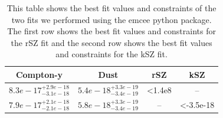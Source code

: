 \documentclass{princeton_astro_thesis}
\begin{document}
\begin{table}[h!]
\centering
\begin{tabular}{||c c c c||} 
 \hline
Compton-y & Dust & rSZ & kSZ \\ [0.5ex] 
 \hline\hline %
 $8.3e-17^{+2.9e-18}_{-3.1e-18}$ & $5.4e-18^{+3.3e-19}_{-3.4e-19}$ & <1.4e8 & -- \\[0.25 cm] 
 $7.9e-17^{+2.1e-18}_{-2.1e-18}$ & $5.8e-18^{+3.3e-19}_{-3.4e-19}$ & -- & <-3.5e-18 \\ [1ex] 
 \hline
\end{tabular}
\caption{This table shows the best fit values and constraints of the two fits we performed using the emcee python package. The first row shows the best fit values and constraints for the rSZ fit and the second row shows the best fit values and constraints for the kSZ fit.}
\label{table:1}
\end{table}
\end{document}

